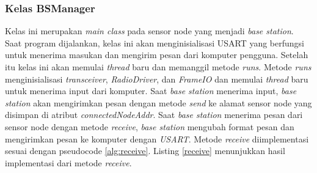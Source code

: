 \subsubsection{Kelas BSManager}
Kelas ini merupakan {\it main class} pada sensor node yang menjadi {\it base station}. Saat program dijalankan, kelas ini akan menginisialisasi USART yang berfungsi untuk menerima masukan dan mengirim pesan dari komputer pengguna. Setelah itu kelas ini akan memulai {\it thread} baru dan memanggil metode {\it runs}. Metode {\it runs} menginisialisasi {\it transceiver}, {\it RadioDriver}, dan {\it FrameIO} dan memulai {\it thread}
baru untuk menerima input dari komputer. Saat {\it base station} menerima input, {\it base station} akan mengirimkan pesan dengan metode {\it send} ke alamat sensor node yang disimpan di atribut {\it connectedNodeAddr}. Saat {\it base station} menerima pesan dari sensor node dengan metode {\it receive}, {\it base station} mengubah format pesan dan mengirimkan pesan ke komputer dengan {\it USART}. Metode {\it receive} diimplementasi sesuai dengan pseudocode \ref{alg:receive}. Listing \ref{receive} menunjukkan hasil implementasi dari metode {\it receive}.

